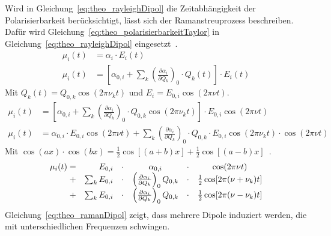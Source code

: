 \documentclass[a4paper,12pt,twoside,parskip=no,headsepline,open=right,ngerman,export]{scrreprt}
\begin{document}
            Wird in Gleichung~\ref{eq:theo_rayleighDipol} die Zeitabhängigkeit der Polarisierbarkeit berücksichtigt, lässt sich der Ramanstreuprozess beschreiben. Dafür wird Gleichung~\ref{eq:theo_polarisierbarkeitTaylor} in Gleichung~\ref{eq:theo_rayleighDipol} eingesetzt~\cite{wilson_molecular_1955}.
            \begin{align*}
                \mu_i(t) &= \alpha_i \cdot E_i(t) \\
                \mu_i(t) &= 
                    \left[  \alpha_{0,i} 
                        + \sum_k \left(\frac{\partial \alpha_i}{\partial Q_k}\right)_0 \cdot Q_k(t) 
                    \right] \cdot E_i(t)
            \end{align*}
            Mit $Q_k(t) = Q_{0,k} \cos(2\pi \nu_k t)$ und $E_i = E_{0,i}\cos(2\pi \nu t)$.
            \begin{align*}
                \mu_i(t) &= \left[  \alpha_{0,i} 
                        + \sum_k \left(\frac{\partial \alpha_i}{\partial Q_k}\right)_0 
                          \cdot Q_{0,k} \cos(2\pi \nu_k t) 
                    \right] \cdot E_{0,i}\cos(2\pi \nu t) \\
                \mu_i(t) &= \alpha_{0,i} \cdot E_{0,i}\cos(2\pi \nu t)
                        + \sum_k \left(\frac{\partial \alpha_i}{\partial Q_k}\right)_0 
                          \cdot Q_{0,k} \cdot E_{0,i} \cos(2\pi \nu_k t) \cdot \cos(2\pi \nu t)
            \end{align*}
            Mit $\cos(a x)\cdot\cos(b x) = \frac{1}{2}\cos[(a+b)x] +\frac{1}{2}\cos[(a-b)x]$~\cite{bronstein_taschenbuch_2000}.
            \begin{equation}
                \begin{array}{r rc cc c}
                    \mu_i(t) =& E_{0,i} &\cdot& \alpha_{0,i}                                                   &\cdot& \cos(2\pi \nu t) \\
                    +&\sum_k    E_{0,i} &\cdot& \left(\frac{\partial \alpha_i}{\partial Q_k}\right)_0 Q_{0,k}  &\cdot& \frac{1}{2} \cos[2\pi (\nu+\nu_k) t] \\
                    +&\sum_k    E_{0,i} &\cdot& \left(\frac{\partial \alpha_i}{\partial Q_k}\right)_0 Q_{0,k}  &\cdot& \frac{1}{2}\cos[2\pi (\nu-\nu_k) t]
                \end{array}
                \label{eq:theo_ramanDipol}
            \end{equation}
            Gleichung~\ref{eq:theo_ramanDipol} zeigt, dass mehrere Dipole induziert werden, die mit unterschiedlichen Frequenzen schwingen. 
            
\end{document}

